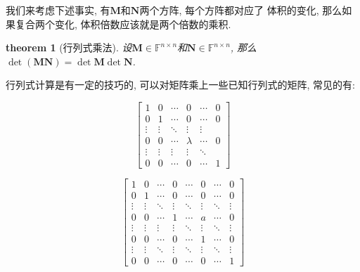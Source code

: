 \documentclass[12pt]{ctexbook}
\numberwithin{definition}{section}
\newtheorem{theorem}{theorem}
\numberwithin{theorem}{section}
\numberwithin{exercise}{section}
\numberwithin{example}{section}
\numberwithin{lemma}{section}
\begin{document}
    我们来考虑下述事实, 有\(\mathbf{M}\)和\(\mathbf{N}\)两个方阵, 每个方阵都对应了
    体积的变化, 那么如果复合两个变化, 体积倍数应该就是两个倍数的乘积.

    \begin{theorem}
        [行列式乘法] 设\(\mathbf{M} \in \mathbb{F}^{n \times n}\)和\(\mathbf{N} \in \mathbb{F}^{n \times n}\),
        那么\(\det(\mathbf{M} \mathbf{N}) = \det \mathbf{M} \det \mathbf{N}\).
    \end{theorem}

    行列式计算是有一定的技巧的, 可以对矩阵乘上一些已知行列式的矩阵, 常见的有:

    \begin{equation}
        \begin{bmatrix}
            1 & 0 & \cdots & 0 & \cdots & 0 \\
            0 & 1 & \cdots & 0 & \cdots & 0 \\
            \vdots & \vdots & \ddots & \vdots & \vdots \\
            0 & 0 & \cdots & \lambda & \cdots & 0 \\
            \vdots & \vdots & \vdots & \vdots & \ddots \\
            0 & 0 & \cdots & 0 & \cdots & 1
        \end{bmatrix}
    \end{equation}

    \begin{equation}
        \begin{bmatrix}
            1 & 0 & \cdots & 0 & \cdots & 0 & \cdots & 0 \\
            0 & 1 & \cdots & 0 & \cdots & 0 & \cdots & 0 \\
            \vdots & \vdots & \ddots & \vdots & \ddots & \vdots & \ddots & \vdots \\
            0 & 0 & \cdots & 1 & \cdots & a & \cdots & 0 \\
            \vdots & \vdots & \vdots & \vdots & \ddots & \vdots & \ddots & \vdots \\
            0 & 0 & \cdots & 0 & \cdots & 1 & \cdots & 0 \\
            \vdots & \vdots & \ddots & \vdots & \ddots & \vdots & \ddots & \vdots \\
            0 & 0 & \cdots & 0 & \cdots & 0 & \cdots & 1
        \end{bmatrix}
    \end{equation}
\end{document}
